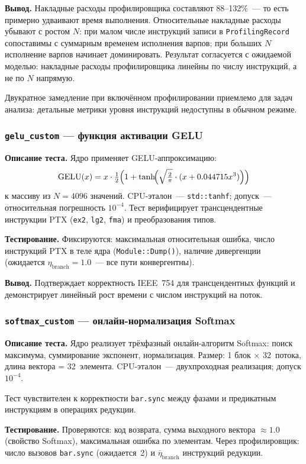 \textbf{Вывод.}
Накладные расходы профилировщика составляют 88--132\%~--- то есть примерно
удваивают время выполнения. Относительные накладные расходы убывают с ростом $N$:
при малом числе инструкций записи в \texttt{ProfilingRecord}
сопоставимы с суммарным временем исполнения варпов;
при больших $N$ исполнение варпов начинает доминировать.
Результат согласуется с ожидаемой моделью: накладные расходы профилировщика
линейны по числу инструкций, а не по $N$ напрямую.

Двукратное замедление при включённом профилировании приемлемо для задач
анализа: детальные метрики уровня инструкций недоступны в обычном режиме.

\subsubsection{\texttt{gelu\_custom} --- функция активации GELU}

\textbf{Описание теста.}
Ядро применяет GELU-аппроксимацию:
\[
  \mathrm{GELU}(x) = x \cdot \tfrac{1}{2}
  \Bigl(1 + \tanh\!\Bigl(\sqrt{\tfrac{2}{\pi}} \cdot
  (x + 0.044715 x^3)\Bigr)\Bigr)
\]
к массиву из $N=4096$ значений. CPU-эталон~--- \texttt{std::tanhf};
допуск~--- относительная погрешность $10^{-4}$.
Тест верифицирует трансцендентные инструкции PTX (\texttt{ex2},
\texttt{lg2}, \texttt{fma}) и преобразования типов.

\textbf{Тестирование.}
Фиксируются: максимальная относительная ошибка, число инструкций
PTX в теле ядра (\texttt{Module::Dump()}), наличие дивергенции
(ожидается $\eta_{\mathrm{branch}} = 1.0$~--- все пути конвергентны).

\textbf{Вывод.}
Подтверждает корректность IEEE~754 для трансцендентных функций
и демонстрирует линейный рост времени с числом инструкций на поток.

\subsubsection{\texttt{softmax\_custom} --- онлайн-нормализация Softmax}

\textbf{Описание теста.}
Ядро реализует трёхфазный онлайн-алгоритм Softmax: поиск максимума,
суммирование экспонент, нормализация. Размер: 1 блок × 32~потока,
длина вектора = 32~элемента. CPU-эталон~--- двухпроходная реализация;
допуск $10^{-4}$.

Тест чувствителен к корректности \texttt{bar.sync} между фазами
и предикатным инструкциям в операциях редукции.

\textbf{Тестирование.}
Проверяются: код возврата, сумма выходного вектора $\approx 1.0$
(свойство Softmax), максимальная ошибка по элементам. Через
профилировщик: число вызовов \texttt{bar.sync} (ожидается~2)
и $\overline{\eta}_{\mathrm{branch}}$ инструкций редукции.

